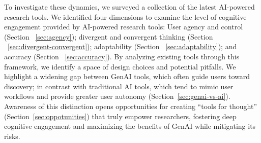 To investigate these dynamics, we surveyed a collection of the latest AI-powered research tools. We identified four dimensions to examine the level of cognitive engagement provided by AI-powered research tools: User agency and control (Section ~\ref{sec:agency}); divergent and convergent thinking (Section ~\ref{sec:divergent-convergent}); adaptability (Section ~\ref{sec:adaptability}); and accuracy (Section ~\ref{sec:accuracy}). By analyzing existing tools through this framework, we identify a space of design choices and potential pitfalls. We highlight a widening gap between GenAI tools, which often guide users toward discovery; in contrast with traditional AI tools, which tend to mimic user workflows and provide greater user autonomy (Section~\ref{sec:genai-vs-ai}). Awareness of this distinction opens opportunities for creating ``tools for thought'' (Section~\ref{sec:oppotunities}) that truly empower researchers, fostering deep cognitive engagement and maximizing the benefits of GenAI while mitigating its risks.

